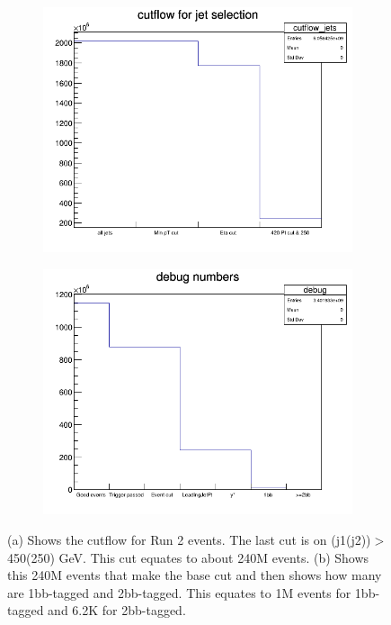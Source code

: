 \begin{figure}[ht]
    \centering
    \begin{subfigure}[h]{0.45\linewidth}
    \includegraphics[scale=0.35]{figs/ch7/cutflow.png}%
    \caption{}
    \end{subfigure}
    \hfill
    \begin{subfigure}[h]{0.45\linewidth}
    \includegraphics[scale=0.35]{figs/ch7/debug.png}%
    \caption{}
    \end{subfigure}
    \hfill
    \caption{(a) Shows the cutflow for Run 2 events. The last cut is on (j1(j2))$>$450(250) GeV. This cut equates to about 240M events. (b) Shows this 240M events that make the
             base cut and then shows how many are 1bb-tagged and 2bb-tagged. This equates to 1M events for 1bb-tagged and 6.2K for 2bb-tagged.}
\label{fig:sh4b-cutflow}
\end{figure}

